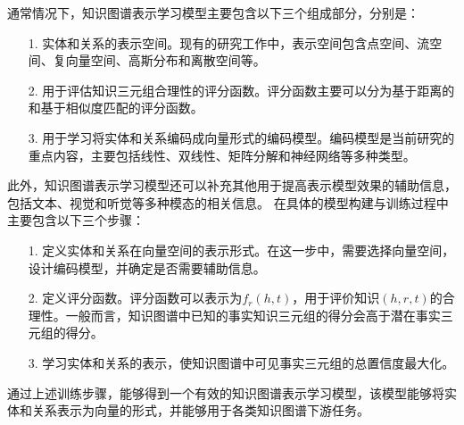 \documentclass[algorithmlist, AutoFakeBold, AutoFakeSlant, figurelist, tablelist, nomlist, engineering]{seuthesix}
\begin{document}
通常情况下，知识图谱表示学习模型主要包含以下三个组成部分，分别是：
\begin{itemize}
  \item [1.] 实体和关系的表示空间。现有的研究工作中，表示空间包含点空间、流空间、复向量空间、高斯分布和离散空间等。
  \item [2.] 用于评估知识三元组合理性的评分函数。评分函数主要可以分为基于距离的和基于相似度匹配的评分函数。
  \item [3.] 用于学习将实体和关系编码成向量形式的编码模型。编码模型是当前研究的重点内容，主要包括线性、双线性、矩阵分解和神经网络等多种类型。
\end{itemize}
此外，知识图谱表示学习模型还可以补充其他用于提高表示模型效果的辅助信息，包括文本、视觉和听觉等多种模态的相关信息。
在具体的模型构建与训练过程中主要包含以下三个步骤：
\begin{itemize}
  \item [1.] 定义实体和关系在向量空间的表示形式。在这一步中，需要选择向量空间，设计编码模型，并确定是否需要辅助信息。
  \item [2.] 定义评分函数。评分函数可以表示为$f_r(h, t)$，用于评价知识$(h, r, t)$的合理性。一般而言，知识图谱中已知的事实知识三元组的得分会高于潜在事实三元组的得分。
  \item [3.] 学习实体和关系的表示，使知识图谱中可见事实三元组的总置信度最大化。
\end{itemize}
通过上述训练步骤，能够得到一个有效的知识图谱表示学习模型，该模型能够将实体和关系表示为向量的形式，并能够用于各类知识图谱下游任务。
\end{document}
